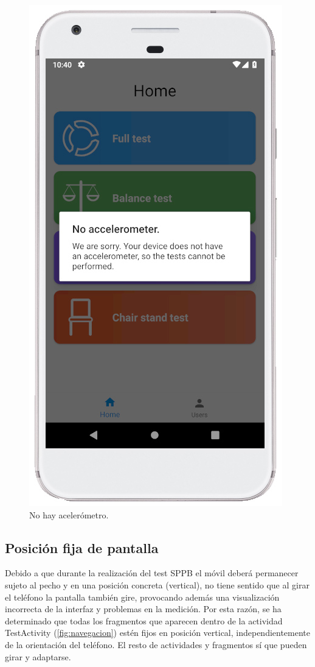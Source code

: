 \begin{figure}[H]
	\centering
	\includegraphics[scale=0.35]{imagenes/no_acc.jpg}
	\caption{No hay acelerómetro.\label{fig:no_acc}}
\end{figure}

\subsection{Posición fija de pantalla}

Debido a que durante la realización del test SPPB el móvil deberá permanecer sujeto al pecho y en una posición concreta (vertical), no tiene sentido que al girar el teléfono la pantalla también gire, provocando además una visualización incorrecta de la interfaz y problemas en la medición. Por esta razón, se ha determinado que todas los fragmentos que aparecen dentro de la actividad TestActivity (\ref{fig:navegacion}) estén fijos en posición vertical, independientemente de la orientación del teléfono. El resto de actividades y fragmentos sí que pueden girar y adaptarse.

